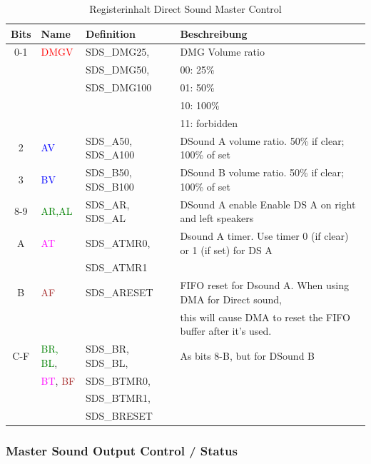\documentclass[11pt,a4paper]{scrartcl}
\begin{document}
\begin{table}[h]
	\centering
	\begin{tabular}{| c | l | l | l |}
	    \hline
	    \textbf{Bits} & \textbf{Name} & \textbf{Definition} & \textbf{Beschreibung} \\
	    \hline
	    0-1 & \textcolor{red}{DMGV} & SDS\_DMG25, & DMG Volume ratio \\
	    & & SDS\_DMG50, & 00: 25\% \\
	    & & SDS\_DMG100 & 01: 50\% \\
	    & & & 10: 100\% \\
        & & & 11: forbidden \\
	    \hline
	    2 & \textcolor{blue}{AV} & SDS\_A50, SDS\_A100 & DSound A volume ratio. 50\% if clear; 100\% of set  \\
	    \hline
	    3 & \textcolor{blue}{BV} & SDS\_B50, SDS\_B100 & DSound B volume ratio. 50\% if clear; 100\% of set  \\
	    \hline
	    8-9 & \textcolor{green}{AR,AL} & SDS\_AR, SDS\_AL & DSound A enable Enable DS A on right and left speakers \\
	    \hline
	    A & \textcolor{magenta}{AT} & SDS\_ATMR0, & Dsound A timer. Use timer 0 (if clear) or 1 (if set) for DS A \\
	    & & SDS\_ATMR1 & \\
	    \hline
	    B & \textcolor{brown}{AF} & SDS\_ARESET &  FIFO reset for Dsound A. When using DMA for Direct sound,  \\
	    & & & this will cause DMA to reset the FIFO buffer after it's used.\\
	    \hline
	    C-F & \textcolor{green}{BR, BL},  &  SDS\_BR, SDS\_BL, & As bits 8-B, but for DSound B \\
	    & \textcolor{magenta}{BT}, \textcolor{brown}{BF} & SDS\_BTMR0,  & \\
	    & & SDS\_BTMR1, & \\
	    & &  SDS\_BRESET & \\
	    \hline
	\end{tabular}
	\caption{Registerinhalt Direct Sound Master Control}
	\label{table: DirectSoundMasterControlContent}
\end{table}
	
\newpage
	
	
\subsubsection{Master Sound Output Control / Status}
	
\end{document}
